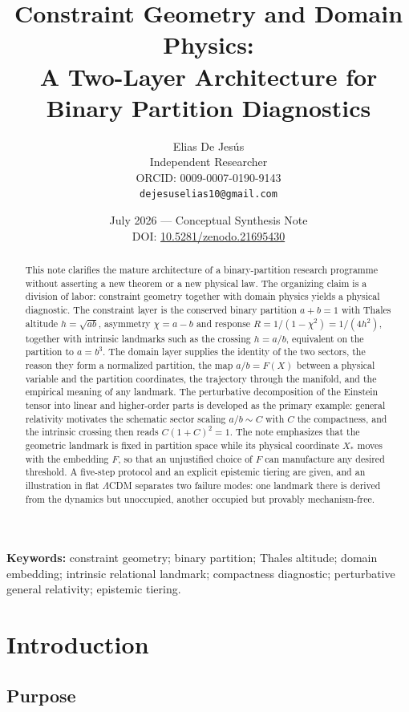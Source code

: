 \documentclass[11pt,a4paper]{article}
\title{\bfseries Constraint Geometry and Domain Physics:\\
A Two-Layer Architecture for Binary Partition Diagnostics}
\author{Elias De Jes\'us\\
\small Independent Researcher\\
\small ORCID: 0009-0007-0190-9143\\
\small \texttt{dejesuselias10@gmail.com}}
\date{July 2026 --- Conceptual Synthesis Note\\[2pt]
\small DOI: \href{https://doi.org/10.5281/zenodo.21695430}{10.5281/zenodo.21695430}}
\theoremstyle{definition}
\theoremstyle{plain}
\theoremstyle{remark}
\begin{document}
\maketitle

\begin{abstract}
\noindent
This note clarifies the mature architecture of a binary-partition research
programme without asserting a new theorem or a new physical law. The organizing
claim is a division of labor: constraint geometry together with domain physics
yields a physical diagnostic. The constraint layer is the conserved binary
partition $a+b=1$ with Thales altitude $h=\sqrt{ab}$, asymmetry $\chi=a-b$ and
response $R=1/(1-\chi^{2})=1/(4h^{2})$, together with intrinsic landmarks such
as the crossing $h=a/b$, equivalent on the partition to $a=b^{3}$. The domain layer supplies the identity of
the two sectors, the reason they form a normalized partition, the map
$a/b=F(X)$ between a physical variable and the partition coordinates, the
trajectory through the manifold, and the empirical meaning of any landmark. The
perturbative decomposition of the Einstein tensor into linear and higher-order
parts is developed as the primary example: general relativity motivates the
schematic sector scaling $a/b\sim C$ with $C$ the compactness, and the
intrinsic crossing then reads $C(1+C)^{2}=1$. The note emphasizes that the
geometric landmark is fixed in partition space while its physical coordinate
$X_{*}$ moves with the embedding $F$, so that an unjustified choice of $F$ can
manufacture any desired threshold. A five-step protocol and an explicit
epistemic tiering are given, and an illustration in flat $\Lambda$CDM
separates two failure modes: one landmark there is derived from the dynamics
but unoccupied, another occupied but provably mechanism-free.
\end{abstract}

\noindent\textbf{Keywords:} constraint geometry; binary partition; Thales
altitude; domain embedding; intrinsic relational landmark; compactness
diagnostic; perturbative general relativity; epistemic tiering.

\tableofcontents

\section{Introduction}

\subsection{Purpose}
\end{document}
